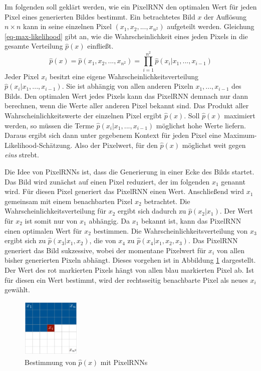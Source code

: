 Im folgenden soll geklärt werden, wie ein \ac{PixelRNN} den optimalen Wert für jeden Pixel eines generierten Bildes bestimmt. Ein betrachtetes Bild $x$ der Auflösung $n \times n$ kann in seine einzelnen Pixel $(x_{1}, x_{2}, ..., x_{n^2})$ aufgeteilt werden. Gleichung \ref{eq-max-likelihood} gibt an, wie die Wahrscheinlichkeit eines jeden Pixels in die gesamte Verteilung $\hat{p}(x)$ einfließt. \cite{pixelRNN}
\begin{equation}
   \label{eq-max-likelihood}
   \hat{p}(x) = \hat{p}(x_{1}, x_{2}, ..., x_{n^2}) = \prod_{i=1}^{n^2}\hat{p}(x_{i}|x_{1},...,x_{i-1})
\end{equation}
Jeder Pixel $x_{i}$ besitzt eine eigene Wahrscheinlichkeitsverteilung $\hat{p}(x_{i}|x_{1},...,x_{i-1})$. Sie ist abhängig von allen anderen Pixeln $x_{1},...,x_{i-1}$ des Bilds. Den optimalen Wert jedes Pixels kann das \ac{PixelRNN} demnach nur dann berechnen, wenn die Werte aller anderen Pixel bekannt sind. Das Produkt aller Wahrscheinlichkeitswerte der einzelnen Pixel ergibt $\hat{p}(x)$. Soll $\hat{p}(x)$ maximiert werden, so müssen die Terme $\hat{p}(x_{i}|x_{1},...,x_{i-1})$ möglichst hohe Werte liefern. Daraus ergibt sich dann unter gegebenem Kontext für jeden Pixel eine Maximum-Likelihood-Schätzung. Also der Pixelwert, für den $\hat{p}(x)$ möglichst weit gegen \emph{eins} strebt. \cite{pixelRNN}

Die Idee von PixelRNNs ist, dass die Generierung in einer Ecke des Bilds startet. Das Bild wird zunächst auf einen Pixel reduziert, der im folgenden $x_{1}$ genannt wird. Für diesen Pixel generiert das \ac{PixelRNN} einen Wert. Anschließend wird $x_{1}$ gemeinsam mit einem benachbarten Pixel $x_{2}$ betrachtet. Die Wahrscheinlichkeitsverteilung für $x_{2}$ ergibt sich dadurch zu $\hat{p}(x_{2}|x_{1})$. Der Wert für $x_2$ ist somit nur von $x_1$ abhängig. Da $x_{1}$ bekannt ist, kann das \ac{PixelRNN} einen optimalen Wert für $x_{2}$ bestimmen. Die Wahrscheinlichkeitsverteilung von $x_{3}$ ergibt sich zu $\hat{p}(x_{3}|x_{1}, x_{2})$, die von $x_{4}$ zu $\hat{p}(x_{4}|x_{1}, x_{2}, x_{3})$. Das \ac{PixelRNN} generiert das Bild sukzessive, wobei der momentane Pixelwert für $x_{i}$ von allen bisher generierten Pixeln abhängt. Dieses vorgehen ist in Abbildung \ref{fig:pixelRNN} dargestellt. Der Wert des rot markierten Pixels hängt von allen blau markierten Pixel ab. Ist für diesen ein Wert bestimmt, wird der rechtsseitig benachbarte Pixel als neues $x_{i}$ gewählt.

\begin{figure}[h]
   \centering
   \includegraphics[width=0.25\textwidth]{images/Generative Networks/PixelRNN.png}
   \caption{Bestimmung von $\hat{p}(x)$ mit PixelRNNs \cite{pixelRNN}}
   \label{fig:pixelRNN}
\end{figure}


